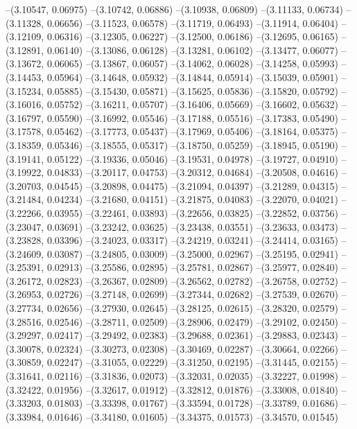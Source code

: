 --(3.10547, 0.06975)
--(3.10742, 0.06886)
--(3.10938, 0.06809)
--(3.11133, 0.06734)
--(3.11328, 0.06656)
--(3.11523, 0.06578)
--(3.11719, 0.06493)
--(3.11914, 0.06404)
--(3.12109, 0.06316)
--(3.12305, 0.06227)
--(3.12500, 0.06186)
--(3.12695, 0.06165)
--(3.12891, 0.06140)
--(3.13086, 0.06128)
--(3.13281, 0.06102)
--(3.13477, 0.06077)
--(3.13672, 0.06065)
--(3.13867, 0.06057)
--(3.14062, 0.06028)
--(3.14258, 0.05993)
--(3.14453, 0.05964)
--(3.14648, 0.05932)
--(3.14844, 0.05914)
--(3.15039, 0.05901)
--(3.15234, 0.05885)
--(3.15430, 0.05871)
--(3.15625, 0.05836)
--(3.15820, 0.05792)
--(3.16016, 0.05752)
--(3.16211, 0.05707)
--(3.16406, 0.05669)
--(3.16602, 0.05632)
--(3.16797, 0.05590)
--(3.16992, 0.05546)
--(3.17188, 0.05516)
--(3.17383, 0.05490)
--(3.17578, 0.05462)
--(3.17773, 0.05437)
--(3.17969, 0.05406)
--(3.18164, 0.05375)
--(3.18359, 0.05346)
--(3.18555, 0.05317)
--(3.18750, 0.05259)
--(3.18945, 0.05190)
--(3.19141, 0.05122)
--(3.19336, 0.05046)
--(3.19531, 0.04978)
--(3.19727, 0.04910)
--(3.19922, 0.04833)
--(3.20117, 0.04753)
--(3.20312, 0.04684)
--(3.20508, 0.04616)
--(3.20703, 0.04545)
--(3.20898, 0.04475)
--(3.21094, 0.04397)
--(3.21289, 0.04315)
--(3.21484, 0.04234)
--(3.21680, 0.04151)
--(3.21875, 0.04083)
--(3.22070, 0.04021)
--(3.22266, 0.03955)
--(3.22461, 0.03893)
--(3.22656, 0.03825)
--(3.22852, 0.03756)
--(3.23047, 0.03691)
--(3.23242, 0.03625)
--(3.23438, 0.03551)
--(3.23633, 0.03473)
--(3.23828, 0.03396)
--(3.24023, 0.03317)
--(3.24219, 0.03241)
--(3.24414, 0.03165)
--(3.24609, 0.03087)
--(3.24805, 0.03009)
--(3.25000, 0.02967)
--(3.25195, 0.02941)
--(3.25391, 0.02913)
--(3.25586, 0.02895)
--(3.25781, 0.02867)
--(3.25977, 0.02840)
--(3.26172, 0.02823)
--(3.26367, 0.02809)
--(3.26562, 0.02782)
--(3.26758, 0.02752)
--(3.26953, 0.02726)
--(3.27148, 0.02699)
--(3.27344, 0.02682)
--(3.27539, 0.02670)
--(3.27734, 0.02656)
--(3.27930, 0.02645)
--(3.28125, 0.02615)
--(3.28320, 0.02579)
--(3.28516, 0.02546)
--(3.28711, 0.02509)
--(3.28906, 0.02479)
--(3.29102, 0.02450)
--(3.29297, 0.02417)
--(3.29492, 0.02383)
--(3.29688, 0.02361)
--(3.29883, 0.02343)
--(3.30078, 0.02324)
--(3.30273, 0.02308)
--(3.30469, 0.02287)
--(3.30664, 0.02266)
--(3.30859, 0.02247)
--(3.31055, 0.02229)
--(3.31250, 0.02195)
--(3.31445, 0.02155)
--(3.31641, 0.02116)
--(3.31836, 0.02073)
--(3.32031, 0.02035)
--(3.32227, 0.01998)
--(3.32422, 0.01956)
--(3.32617, 0.01912)
--(3.32812, 0.01876)
--(3.33008, 0.01840)
--(3.33203, 0.01803)
--(3.33398, 0.01767)
--(3.33594, 0.01728)
--(3.33789, 0.01686)
--(3.33984, 0.01646)
--(3.34180, 0.01605)
--(3.34375, 0.01573)
--(3.34570, 0.01545)
